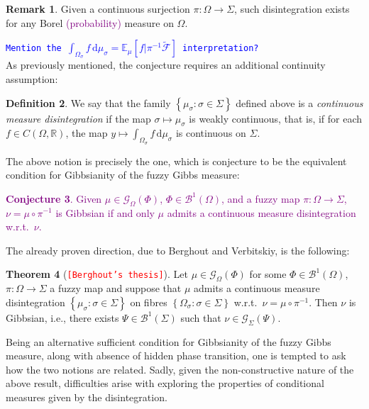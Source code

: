 \documentclass[12pt]{article}
\newcommand{\BB}{\mathscr{B}}
\renewcommand{\d}{\mathrm{d}}
\newcommand{\F}{\mathcal{F}}
\newcommand{\G}{\mathcal{G}}
\newcommand{\R}{\mathbb{R}}
\newcommand{\set}[1]{\left\{#1\right\}}
\newcommand{\ra}{\rightarrow}
\newcommand{\1}{\mathbbm{1}}
\newcommand{\5}{\vspace{0.5cm}}
\renewcommand{\tilde}{\widetilde}
\theoremstyle{definition}
\newtheorem{thm}{Theorem}[section]
\newtheorem{df}[thm]{Definition}
\newtheorem{rem}[thm]{Remark}
\newtheorem{conj}[thm]{Conjecture}
\begin{document}
\begin{rem}
Given a continuous surjection $\pi:\Omega\ra\Sigma$, such disintegration exists for any Borel \textcolor{purple}{(probability)} measure on $\Omega$.
\end{rem}

\textcolor{blue}{\texttt{Mention the $\int_{\Omega_\sigma}f\,\d\mu_\sigma=\mathbb{E}_\mu[f|\pi^{-1}\tilde{\F}]$ interpretation?}}\\

As previously mentioned, the conjecture requires an additional continuity assumption:

\begin{df}
We say that the family $\set{\mu_\sigma:\sigma\in\Sigma}$ defined above is a \textit{continuous measure disintegration} if the map $\sigma\mapsto\mu_\sigma$ is weakly continuous, that is, if for each $f\in C(\Omega,\R)$, the map $y\mapsto\int_{\Omega_\sigma}f\,\d\mu_\sigma$ is continuous on $\Sigma$.
\end{df}

The above notion is precisely the one, which is conjecture to be the equivalent condition for Gibbsianity of the fuzzy Gibbs measure:
\textcolor{purple}{
\begin{conj}
Given $\mu\in\G_\Omega(\Phi)$, $\Phi\in\BB^1(\Omega)$, and a fuzzy map $\pi:\Omega\ra\Sigma$, $\nu=\mu\circ\pi^{-1}$ is Gibbsian if and only $\mu$ admits a continuous measure disintegration w.r.t.~$\nu$.
\end{conj}}

The already proven direction, due to Berghout and Verbitskiy, is the following:
\begin{thm}[\textcolor{red}{\texttt{[Berghout's thesis]}}]
Let $\mu\in\G_\Omega(\Phi)$ for some $\Phi\in\BB^1(\Omega)$, $\pi:\Omega\ra\Sigma$ a fuzzy map and suppose that $\mu$ admits a continuous measure disintegration $\set{\mu_\sigma:\sigma\in\Sigma}$ on fibres $\set{\Omega_\sigma:\sigma\in\Sigma}$ w.r.t.~$\nu=\mu\circ\pi^{-1}$. Then $\nu$ is Gibbsian, i.e., there exists $\Psi\in\BB^1(\Sigma)$ such that $\nu\in\G_\Sigma(\Psi)$.
\end{thm}

Being an alternative sufficient condition for Gibbsianity of the fuzzy Gibbs measure, along with absence of hidden phase transition, one is tempted to ask how the two notions are related. Sadly, given the non-constructive nature of the above result, difficulties arise with exploring the properties of conditional measures given by the disintegration. \\
\end{document}
